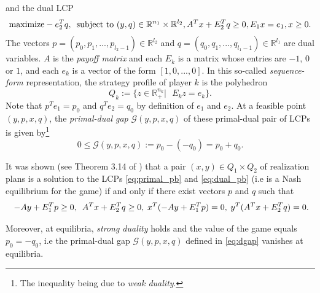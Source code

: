 \documentclass[envcountsame]{llcns2e/llncs}
\begin{document}
and the dual LCP
\begin{equation}
  \begin{aligned}
    \text{maximize}-e_2^Tq,\hspace{.5em}\text{subject to }(y,q) \in
    \mathbb{R}^{n_1} \times \mathbb{R}^{l_2}, A^Tx + E_2^Tq \geq 0,
    E_1x = e_1, x \ge 0.
  \end{aligned}
  \label{eq:dual_pb}
\end{equation}
The vectors $p = (p_0, p_1, ..., p_{l_2 - 1}) \in \mathbb{R}^{l_2}$
and $q = (q_0, q_1, ..., q_{l_1 - 1}) \in \mathbb{R}^{l_1}$ are dual
variables. 
$A$ is the \textit{payoff matrix} and each $E_k$ is a matrix whose
entries are $-1$, $0$ or $1$, and each $e_k$ is a vector of the form
$[1, 0, ..., 0]$. In this so-called \textit{sequence-form}
representation, the strategy profile of player $k$ is the polyhedron
\begin{equation}
  Q_k := \{z \in \mathbb{R}^{n_k}_+ |\text{ }E_kz = e_k\}.
\label{eq:polyhedron}
\end{equation}
Note that $p^Te_1 = p_0$ and $q^Te_2 = q_0$ by definition of $e_1$ and
$e_2$. At a feasible point $(y, p, x, q)$, the \textit{primal-dual gap}
$\mathcal{G}(y, p, x, q)$ of these primal-dual pair of LCPs is given
by\footnote{The inequality being due to \textit{weak duality}.}
\begin{equation}
  0 \le \mathcal{G}(y, p, x, q) := p_0 - (-q_0) = p_0 + q_0.
  \label{eq:dgap}
\end{equation}

It was shown (see Theorem 3.14 of \cite{vonequilibrium}) that a pair
$(x, y) \in Q_1 \times Q_2$ of realization plans is a solution to the
LCPs \eqref{eq:primal_pb} and \eqref{eq:dual_pb} (i.e is a Nash
equilibrium for the game)  if and only if there exist vectors $p$ and
$q$ such that
\begin{equation}
\hspace{.25em} -Ay + E_1^Tp \ge 0, \hspace{.5em}A^Tx + E_2^Tq \ge
0, \hspace{.25em} x^T(-Ay + E_1^Tp) = 0, \hspace{.25em} y^T(A^Tx +
E_2^Tq) = 0.
\label{eq:feasibility}
\end{equation}

Moreover, at equilibria, \textit{strong duality} holds and the value
of the game equals $p_0 = -q_0$, i.e the primal-dual gap
$\mathcal{G}(y, p, x, q)$ defined in \eqref{eq:dgap} vanishes at
equilibria.
\end{document}

